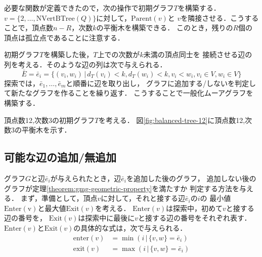 必要な関数が定義できたので，次の操作で初期グラフ$T$を構築する．
$v=\{2,\ldots,\mathrm{NVertBTree}(Q)\}$に対して，$\mathrm{Parent}(v)$と
$v$を隣接させる．こうすることで，頂点数$n-R$，次数$k$の平衡木を構築できる．
このとき，残りの$R$個の頂点は孤立点であることに注意する．

初期グラフ$T$を構築した後，$T$上での次数が$k$未満の頂点同士を
接続させる辺の列を考える．そのような辺の列は次で与えられる．
\[ \bar{E} = \bar{e}_i = \{(v_i,w_i)\,|
\,d_T(v_i)<k,d_T(w_i)<k,v_i<w_i,v_i\in V,w_i\in V\} \]
探索では，$\bar{e}_1,\ldots,\bar{e}_m$と順番に辺を取り出し，
グラフに追加する/しないを判定して新たなグラフを作ることを繰り返す．
こうすることで一般化ムーアグラフを構築する．

\begin{example}
  頂点数12,次数3の初期グラフ$T$を考える．
  図\ref{fig:balanced-tree-12}に頂点数12,次数3の平衡木を示す．
\end{example}

\subsection{可能な辺の追加/無追加}
\label{subsect:feasible-edge-(no)-addition}
グラフ$G$と辺$\bar{e}_i$が与えられたとき，辺$\bar{e}_i$を追加した後のグラフ，
追加しない後のグラフが定理\ref{theorem:gmg-geometric-property}を満たすか
判定する方法を与える．
まず，準備として，頂点$v$に対して，それと接する辺$\bar{e}_i$の$i$の
最小値$\mathrm{Enter(v)}$と最大値$\mathrm{Exit}(v)$を考える．
$\mathrm{Enter}(v)$は探索中，初めて$v$と接する辺の番号を，
$\mathrm{Exit}(v)$は探索中に最後に$v$と接する辺の番号をそれぞれ表す．
$\mathrm{Enter}(v)$と$\mathrm{Exit}(v)$の具体的な式は，次で与えられる．
\begin{align*}
  \mathrm{enter}(v) &= \min(i\,|\,\{v,w\}=\bar{e}_i) \\
  \mathrm{exit}(v) &= \max(i\,|\,\{v,w\}=\bar{e}_i)
\end{align*}

